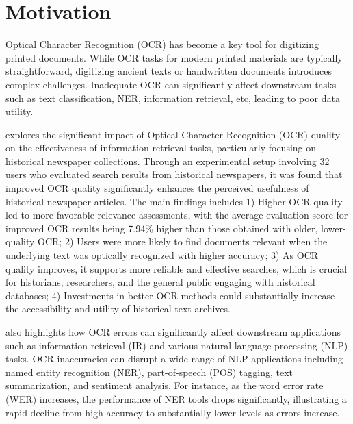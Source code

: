 \label{chap:1_intro}
\section{Motivation}
\label{sec:1_motivation}
Optical Character Recognition (OCR) has become a key tool for digitizing printed documents. While OCR tasks for modern printed materials are typically straightforward, digitizing ancient texts or handwritten documents introduces complex challenges. Inadequate OCR can significantly affect downstream tasks such as text classification, NER, information retrieval, etc, leading to poor data utility. 

\citep{kettunen2022ocr} explores the significant impact of Optical Character Recognition (OCR) quality on the effectiveness of information retrieval tasks, particularly focusing on historical newspaper collections. Through an experimental setup involving 32 users who evaluated search results from historical newspapers, it was found that improved OCR quality significantly enhances the perceived usefulness of historical newspaper articles. The main findings includes 1) Higher OCR quality led to more favorable relevance assessments, with the average evaluation score for improved OCR results being 7.94\% higher than those obtained with older, lower-quality OCR; 2) Users were more likely to find documents relevant when the underlying text was optically recognized with higher accuracy; 3) As OCR quality improves, it supports more reliable and effective searches, which is crucial for historians, researchers, and the general public engaging with historical databases; 4) Investments in better OCR methods could substantially increase the accessibility and utility of historical text archives.

\citep{nguyen2021survey} also highlights how OCR errors can significantly affect downstream applications such as information retrieval (IR) and various natural language processing (NLP) tasks. OCR inaccuracies can disrupt a wide range of NLP applications including named entity recognition (NER), part-of-speech (POS) tagging, text summarization, and sentiment analysis. For instance, as the word error rate (WER) increases, the performance of NER tools drops significantly, illustrating a rapid decline from high accuracy to substantially lower levels as errors increase. 


